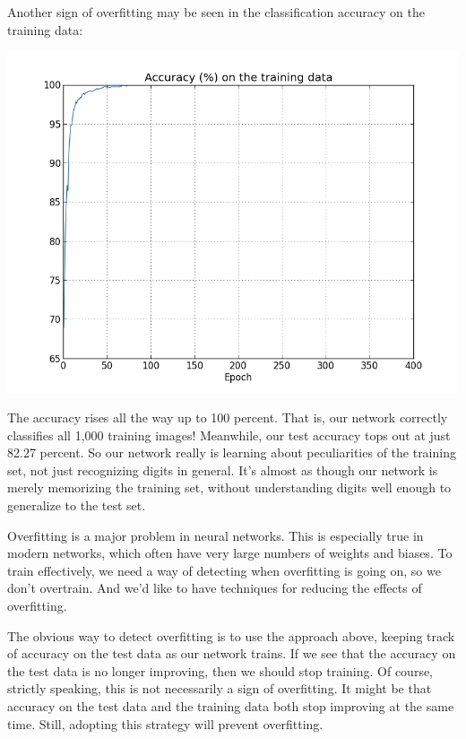 \documentclass[a4paper,twoside,10pt]{book}
\begin{document}
Another sign of overfitting may be seen in the classification accuracy on the training data:
\begin{center}
	\includegraphics[width=0.7\linewidth]{figures/ch3/overfitting4}
\end{center}
The accuracy rises all the way up to 100 percent. That is, our network correctly classifies all 1,000 training images! Meanwhile, our test accuracy tops out at just 82.27 percent. So our network really is learning about peculiarities of the training set, not just recognizing digits in general. It's almost as though our network is merely memorizing the training set, without understanding digits well enough to generalize to the test set.

Overfitting is a major problem in neural networks. This is especially true in modern networks, which often have very large numbers of weights and biases. To train effectively, we need a way of detecting when overfitting is going on, so we don't overtrain. And we'd like to have techniques for reducing the effects of overfitting.

The obvious way to detect overfitting is to use the approach above, keeping track of accuracy on the test data as our network trains. If we see that the accuracy on the test data is no longer improving, then we should stop training. Of course, strictly speaking, this is not necessarily a sign of overfitting. It might be that accuracy on the test data and the training data both stop improving at the same time. Still, adopting this strategy will prevent overfitting.
\end{document}
